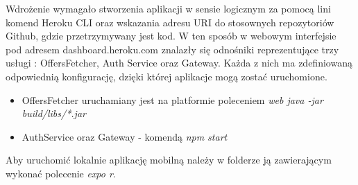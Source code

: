 Wdrożenie wymagało stworzenia aplikacji w sensie logicznym za pomocą lini komend Heroku CLI oraz wskazania adresu URI do stosownych repozytoriów Github, gdzie przetrzymywany jest kod.
W ten sposób w webowym interfejsie pod adresem dashboard.heroku.com znalazły się odnośniki reprezentujące trzy usługi : OffersFetcher, Auth Service oraz Gateway. Każda z nich ma zdefiniowaną odpowiednią konfigurację, dzięki której aplikacje mogą zostać uruchomione.
\begin{itemize}
	\item {OffersFetcher uruchamiany jest na platformie poleceniem \textit{web java -jar build/libs/*.jar}}
	\item {AuthService oraz Gateway - komendą \textit{npm start}}
\end{itemize}

Aby uruchomić lokalnie aplikację mobilną należy w folderze ją zawierającym wykonać polecenie \textit{expo r}.

